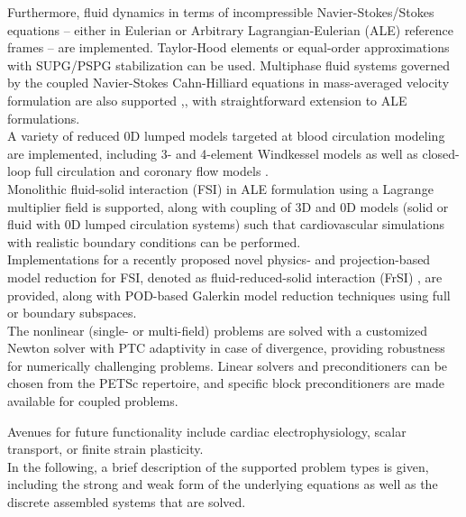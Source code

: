 \documentclass[a4paper,12pt]{report}
\begin{document}
Furthermore, fluid dynamics in terms of incompressible Navier-Stokes/Stokes equations -- either in Eulerian or Arbitrary Lagrangian-Eulerian (ALE) reference frames -- are implemented. Taylor-Hood elements or equal-order approximations with SUPG/PSPG stabilization \cite{tezduyar2000} can be used. Multiphase fluid systems governed by the coupled Navier-Stokes Cahn-Hilliard equations in mass-averaged velocity formulation are also supported \cite{brunk2026},\cite{ten-eikelder2024}, with straightforward extension to ALE formulations.\\

A variety of reduced 0D lumped models targeted at blood circulation modeling are implemented, including 3- and 4-element Windkessel models \cite{westerhof2009} as well as closed-loop full circulation \cite{hirschvogel2017} and coronary flow models \cite{arthurs2016}.\\

Monolithic fluid-solid interaction (FSI) \cite{nordsletten2011} in ALE formulation using a Lagrange multiplier field is supported, along with coupling of 3D and 0D models (solid or fluid with 0D lumped circulation systems) such that cardiovascular simulations with realistic boundary conditions can be performed.\\

Implementations for a recently proposed novel physics- and projection-based model reduction for FSI, denoted as fluid-reduced-solid interaction (FrSI) \cite{hirschvogel2024-frsi}, are provided, along with POD-based Galerkin model reduction techniques \cite{farhat2014} using full or boundary subspaces.\\

The nonlinear (single- or multi-field) problems are solved with a customized Newton solver with PTC \cite{gee2009} adaptivity in case of divergence, providing robustness for numerically challenging problems. Linear solvers and preconditioners can be chosen from the PETSc repertoire, and specific block preconditioners are made available for coupled problems.

Avenues for future functionality include cardiac electrophysiology, scalar transport, or finite strain plasticity.\\

In the following, a brief description of the supported problem types is given, including the strong and weak form of the underlying equations as well as the discrete assembled systems that are solved.\\
\end{document}
